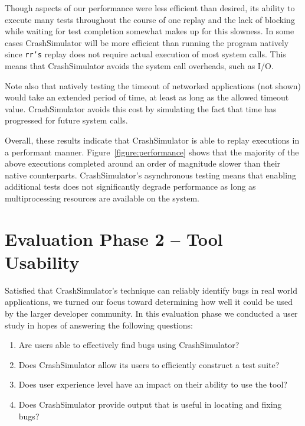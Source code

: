 Though aspects of our performance were less efficient than desired, its
ability to execute many tests throughout the course of one replay and the
lack of blocking while waiting for test completion somewhat makes up for
this slowness. In some cases CrashSimulator will be more efficient than
running the program natively since {\tt rr's} replay does not require
actual execution of most system calls.  This means that CrashSimulator
avoids the system call overheads, such as I/O.

Note also that natively testing the timeout of networked applications (not
shown) would take an extended period of time, at least as long as the
allowed timeout value.  CrashSimulator avoids this cost by simulating the
fact that time has progressed for future system calls.

Overall, these results indicate that CrashSimulator is able to replay
executions in a performant manner.  Figure~\ref{figure:performance} shows
that the majority of the above executions completed around an order of
magnitude slower than their native counterparts.  CrashSimulator's
asynchronous testing means that enabling additional tests does not
significantly degrade performance as long as multiprocessing resources are
available on the system.


\section{Evaluation Phase 2 -- Tool Usability}

Satisfied that CrashSimulator's technique can reliably identify bugs in
real world applications, we turned our focus toward determining how well it
could be used by the larger developer community.  In this evaluation phase
we conducted a user study in hopes of answering the following questions:

\begin{enumerate}

\item Are users able to effectively find bugs using CrashSimulator?

\item Does CrashSimulator allow its users to efficiently construct a test suite?

\item Does user experience level have an impact on their ability to use the
tool?

\item Does CrashSimulator provide output that is useful in locating and
fixing bugs?

\end{enumerate}





